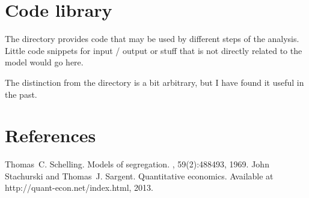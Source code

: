 \documentclass[a4paper,11pt,english]{sphinxmanual}
\begin{document}
\chapter{Code library}
\label{\detokenize{library:code-library}}\label{\detokenize{library:library}}\label{\detokenize{library::doc}}
The directory  provides code that may be used by different steps of the analysis. Little code snippets for input / output or stuff that is not directly related to the model would go here.

The distinction from the {\hyperref[\detokenize{model_code:model-code}]{}} directory is a bit arbitrary, but I have found it useful in the past.


\chapter{References}
\label{\detokenize{references:references}}\label{\detokenize{references:id1}}\label{\detokenize{references::doc}}


\begin{sphinxthebibliography}{1}
Thomas C. Schelling. Models of segregation. , 59(2):488\textendash{}493, 1969.
John Stachurski and Thomas J. Sargent. Quantitative economics. Available at http://quant-econ.net/index.html, 2013.
\end{sphinxthebibliography}


\renewcommand{\indexname}{Python Module Index}
\begin{sphinxtheindex}
\let\bigletter\sphinxstyleindexlettergroup
\bigletter{a}
\item\relax{}
\indexspace
\bigletter{b}
\item\relax{}
\indexspace
\bigletter{d}
\item\relax{}
\indexspace
\bigletter{f}
\item\relax{}
\indexspace
\bigletter{m}
\item\relax{}
\end{sphinxtheindex}

\renewcommand{\indexname}{Index}
\printindex
\end{document}
